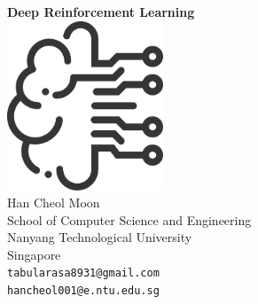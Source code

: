 \documentclass[oneside,a4paper,11pt]{book}
\begin{document}
\begin{titlepage}
	\begin{center}
		\vspace*{5.5cm}
		\textbf{\Huge Deep Reinforcement Learning}\\
        \vspace{2.5cm}
		\includegraphics[width=0.35\textwidth]{./images/logo/logo.pdf}\\
        \vspace{1.5cm}
        \vspace{1.5cm}
		Han Cheol Moon\\
		School of Computer Science and Engineering\\
		Nanyang Technological University\\
		Singapore\\
		\texttt{tabularasa8931@gmail.com}\\
		\texttt{hancheol001@e.ntu.edu.sg}
		\date{\today}
	\end{center}
\end{titlepage}



\tableofcontents
\newpage

\mainmatter










\backmatter




\appendix

\end{document}
